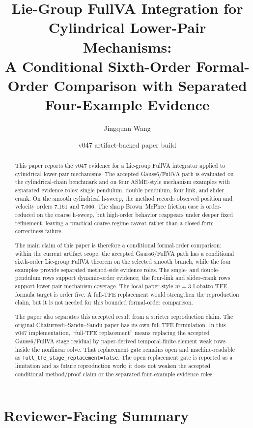 \documentclass[11pt]{article}
\title{Lie-Group FullVA Integration for Cylindrical Lower-Pair Mechanisms:\\
A Conditional Sixth-Order Formal-Order Comparison with Separated Four-Example Evidence}
\author{Jingquan Wang}
\date{v047 artifact-backed paper build}
\newcommand{\method}{Gauss6/FullVA}
\newcommand{\tfe}{TFE}
\begin{document}
\maketitle

\begin{abstract}
This paper reports the v047 evidence for a Lie-group FullVA integrator applied
to cylindrical lower-pair mechanisms.  The accepted \method{} path is evaluated
on the cylindrical-chain benchmark and on four ASME-style mechanism examples
with separated evidence roles: single pendulum, double pendulum, four link,
and slider crank.  On the smooth
cylindrical h-sweep, the method records observed position and velocity orders
7.161 and 7.066.  The sharp Brown--McPhee friction case is order-reduced on the
coarse h-sweep, but high-order behavior reappears under deeper fixed
refinement, leaving a practical coarse-regime caveat rather than a closed-form
correctness failure.

The main claim of this paper is therefore a conditional formal-order
comparison: within the current artifact scope, the accepted \method{} path
has a conditional sixth-order Lie-group FullVA theorem on the selected smooth
branch, while the four examples provide separated method-side evidence roles.
The single- and double-pendulum rows support dynamic-order evidence; the
four-link and slider-crank rows support lower-pair mechanism coverage.  The
local paper-style $m=3$ Lobatto-\tfe{} formula target is order five.  A
full-\tfe{} replacement would strengthen the reproduction claim, but it is not
needed for this bounded formal-order comparison.

The paper also separates this accepted result from a stricter reproduction
claim.  The original Chaturvedi--Sandu--Sandu paper has its own full \tfe{}
formulation.  In this v047 implementation, ``full-\tfe{} replacement'' means
replacing the accepted Gauss6/FullVA stage residual by paper-derived
temporal-finite-element weak rows inside the nonlinear solve.  That replacement
gate remains open and machine-readable as
\nolinkurl{full_tfe_stage_replacement=false}.  The open replacement gate is
reported as a limitation and as future reproduction work; it does not weaken
the accepted conditional method/proof claim or the separated four-example
evidence roles.
\end{abstract}

\section*{Reviewer-Facing Summary}
\end{document}
